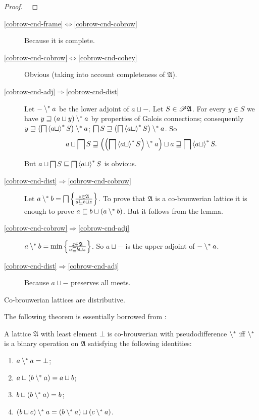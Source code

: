 \begin{proof}
~\end{proof}
\begin{description}
\item [{\ref{cobrow-cnd-frame}$\Leftrightarrow$\ref{cobrow-cnd-cobrow}}] Because it is complete.
\item [{\ref{cobrow-cnd-cobrow}$\Leftrightarrow$\ref{cobrow-cnd-cohey}}] Obvious
(taking into account completeness of $\mathfrak{A}$).
\item [{\ref{cobrow-cnd-adj}$\Rightarrow$\ref{cobrow-cnd-dist}}] Let
$\mathord-\setminus^{\ast} a$ be the lower adjoint of $a\sqcup\mathord-$.
Let $S\in\mathscr{P}\mathfrak{A}$. For every $y\in S$ we have $y\sqsupseteq(a\sqcup y)\setminus^{\ast} a$
by properties of Galois connections; consequently $y\sqsupseteq\left(\bigsqcap\left\langle a\sqcup\right\rangle ^{\ast}S\right)\setminus^{\ast} a$;
$\bigsqcap S\sqsupseteq\left(\bigsqcap\left\langle a\sqcup\right\rangle ^{\ast}S\right)\setminus^{\ast} a$.
So
\[
a\sqcup\bigsqcap S\sqsupseteq\left(\left(\bigsqcap\left\langle a\sqcup\right\rangle ^{\ast}S\right)\setminus^{\ast} a\right)\sqcup a\sqsupseteq\bigsqcap\left\langle a\sqcup\right\rangle ^{\ast}S.
\]



But $a\sqcup\bigsqcap S\sqsubseteq\bigsqcap\left\langle a\sqcup\right\rangle ^{\ast}S$ is
obvious.

\item [{\ref{cobrow-cnd-dist}$\Rightarrow$\ref{cobrow-cnd-cobrow}}] Let
$a\setminus^{\ast} b=\bigsqcap\left\{ \frac{z\in\mathfrak{A}}{a\sqsubseteq b\sqcup z}\right\}$.
To prove that $\mathfrak{A}$ is a co-brouwerian lattice it is enough
to prove $a\sqsubseteq b\sqcup(a\setminus^{\ast} b)$. But it follows from
the lemma.
\item [{\ref{cobrow-cnd-cobrow}$\Rightarrow$\ref{cobrow-cnd-adj}}] $a\setminus^{\ast} b=\min\left\{ \frac{z\in\mathfrak{A}}{a\sqsubseteq b\sqcup z}\right\}$.
So $a\sqcup\mathord-$ is the upper adjoint of $\mathord-\setminus^{\ast} a$.
\item [{\ref{cobrow-cnd-dist}$\Rightarrow$\ref{cobrow-cnd-adj}}] Because
$a\sqcup\mathord-$ preserves all meets.\end{description}
\begin{cor}
Co-brouwerian lattices are distributive.
\end{cor}
The following theorem is essentially borrowed from \cite{stone-spaces}:
\begin{thm}
A lattice $\mathfrak{A}$ with least element $\bot$ is co-brouwerian
with pseudodifference $\setminus^{\ast}$ iff $\setminus^{\ast}$ is a binary
operation on $\mathfrak{A}$ satisfying the following identities:
\begin{enumerate}
\item \label{cbpd-aa}$a\setminus^{\ast} a=\bot$;
\item \label{cbpd-aba}$a\sqcup(b\setminus^{\ast} a)=a\sqcup b$;
\item \label{cbpd-bba}$b\sqcup(b\setminus^{\ast} a)=b$;
\item \label{cbpd-bca}$(b\sqcup c)\setminus^{\ast} a=(b\setminus^{\ast} a)\sqcup(c\setminus^{\ast} a)$.
\end{enumerate}
\end{thm}
